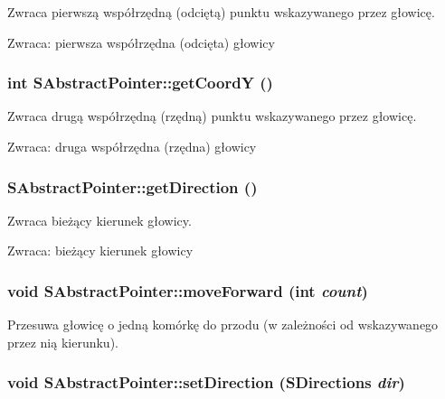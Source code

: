 Zwraca pierwszą współrzędną (odciętą) punktu wskazywanego przez głowicę. \begin{Desc}
\item[Zwraca:]pierwsza współrzędna (odcięta) głowicy \end{Desc}
\hypertarget{classSAbstractPointer_0226e83b6f838f3ee8491915b9ebab74}{
\subsubsection[{getCoordY}]{\setlength{\rightskip}{0pt plus 5cm}int SAbstractPointer::getCoordY ()}}
\label{classSAbstractPointer_0226e83b6f838f3ee8491915b9ebab74}


Zwraca drugą współrzędną (rzędną) punktu wskazywanego przez głowicę. \begin{Desc}
\item[Zwraca:]druga współrzędna (rzędna) głowicy \end{Desc}
\hypertarget{classSAbstractPointer_97b784c62799ff8969483b137bbb2ab5}{
\subsubsection[{getDirection}]{ SAbstractPointer::getDirection ()}}
\label{classSAbstractPointer_97b784c62799ff8969483b137bbb2ab5}


Zwraca bieżący kierunek głowicy. \begin{Desc}
\item[Zwraca:]bieżący kierunek głowicy \end{Desc}
\hypertarget{classSAbstractPointer_c4655988c5ae9f94a00e3ccd0ed14863}{
\subsubsection[{moveForward}]{\setlength{\rightskip}{0pt plus 5cm}void SAbstractPointer::moveForward (int {\em count})}}
\label{classSAbstractPointer_c4655988c5ae9f94a00e3ccd0ed14863}


Przesuwa głowicę o jedną komórkę do przodu (w zależności od wskazywanego przez nią kierunku). \hypertarget{classSAbstractPointer_e1b27cb6a14cbf77e4499d8ca1ae7c90}{
\subsubsection[{setDirection}]{\setlength{\rightskip}{0pt plus 5cm}void SAbstractPointer::setDirection ({\bf SDirections} {\em dir})}}
\label{classSAbstractPointer_e1b27cb6a14cbf77e4499d8ca1ae7c90}


